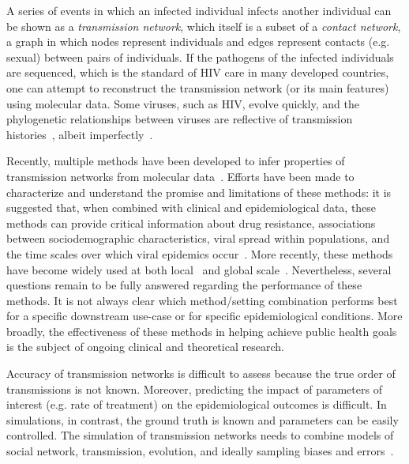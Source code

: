 A series of events in which an infected individual infects another individual can be shown as a \textit{transmission network}, which itself is a subset of a \textit{contact network}, a graph in which nodes represent individuals and edges represent contacts (e.g. sexual) between pairs of individuals. If the pathogens of the infected individuals are sequenced, which is the standard of \gls{HIV} care in many developed countries, one can attempt to reconstruct the transmission network (or its main features) using molecular data. Some viruses, such as HIV, evolve quickly, and the phylogenetic relationships between viruses are reflective of transmission histories~\cite{Leitner1996}, albeit imperfectly~\cite{Ypma2013,Romero-Severson2014,Leitner2018}.

Recently, multiple methods have been developed to infer properties of transmission networks from molecular data~\cite{Prosperi2011,Ragonnet-Cronin2013,Pond2018}. Efforts have been made to characterize and understand the promise and limitations of these methods: it is suggested that, when combined with clinical and epidemiological data, these methods can provide critical information about drug resistance, associations between sociodemographic characteristics, viral spread within populations, and the time scales over which viral epidemics occur~\cite{Grabowski2014}. More recently, these methods have become widely used at both local~\cite{Campbell2017} and global scale~\cite{Wertheim2014}. Nevertheless, several questions remain to be fully answered regarding the performance of these methods.  It is not always clear which method/setting combination performs best for a specific downstream use-case or for specific epidemiological conditions.  More broadly, the effectiveness of these methods in helping achieve public health goals is the subject of ongoing clinical and theoretical research.

Accuracy of transmission networks is difficult to assess because the true order of transmissions is not known. Moreover, predicting the impact of parameters of interest (e.g. rate of treatment) on the epidemiological outcomes is difficult. In simulations, in contrast, the ground truth is known and parameters can be easily controlled. The simulation of transmission networks needs to combine models of social network, transmission, evolution, and ideally sampling biases and errors~\cite{Villandre2016}.

